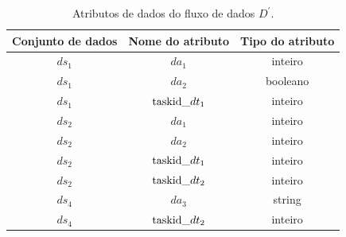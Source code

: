 \begin{table}[!htb]
    \centering
    \begin{tabular}{c|c|c}
    \textbf{Conjunto de dados} & \textbf{Nome do atributo} & \textbf{Tipo do atributo} \\ \hline
$ds_1$                        & $da_1$                        & inteiro                 \\
$ds_1$                        & $da_2$                        & booleano                \\
$ds_1$                        & $\textup{taskid\_}dt_1$      & inteiro                 \\ \hline
$ds_2$                        & $da_1$                        & inteiro                 \\
$ds_2$                        & $da_2$                        & inteiro                 \\
$ds_2$                        & $\textup{taskid\_}dt_1$      & inteiro                 \\
$ds_2$                        & $\textup{taskid\_}dt_2$      & inteiro                 \\ \hline
$ds_4$                        & $da_3$                        & string                  \\
$ds_4$                        & $\textup{taskid\_}dt_2$      & inteiro                  
    \end{tabular}
    \caption[Atributos de dados do fluxo de dados \(D^{\prime}\)]{Atributos de dados do fluxo de dados \(D^{\prime}\).}
    \label{tab:example-query-attributes}
\end{table}

